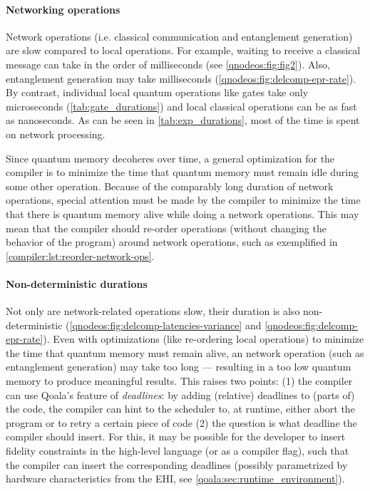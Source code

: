 \paragraph{Networking operations}
Network operations (i.e. classical communication and entanglement generation) are slow compared to local operations.
For example, waiting to receive a classical message can take in the order of milliseconds (see \cref{qnodeos:fig:fig2}).
Also, entanglement generation may take milliseconds (\cref{qnodeos:fig:delcomp-epr-rate}).
By contrast, individual local quantum operations like gates take only microseconds (\cref{tab:gate_durations}) and local classical operations can be as fast as nanoseconds.
As can be seen in \cref{tab:exp_durations}, most of the time is spent on network processing.

Since quantum memory decoheres over time, a general optimization for the compiler is to minimize the time that quantum memory must remain idle during some other operation.
Because of the comparably long duration of network operations, special attention must be made by the compiler to minimize the time that there is quantum memory alive while doing a network operations.
This may mean that the compiler should re-order operations (without changing the behavior of the program) around network operations, such as exemplified in \cref{compiler:lst:reorder-network-ops}.

\paragraph{Non-deterministic durations}
Not only are network-related operations slow, their duration is also non-deterministic (\cref{qnodeos:fig:delcomp-latencies-variance} and \cref{qnodeos:fig:delcomp-epr-rate}).
Even with optimizations (like re-ordering local operations) to minimize the time that quantum memory must remain alive, an network operation (such as entanglement generation) may take too long --- resulting in a too low quantum memory to produce meaningful results.
This raises two points:
(1) the compiler can use Qoala's feature of \emph{deadlines}: by adding (relative) deadlines to (parts of) the code, the compiler can hint to the scheduler to, at runtime, either abort the program or to retry a certain piece of code
(2) the question is what deadline the compiler should insert. For this, it may be possible for the developer to insert fidelity constraints in the high-level language (or as a compiler flag), such that the compiler can insert the corresponding deadlines (possibly parametrized by hardware characteristics from the \acf{EHI}, see \cref{qoala:sec:runtime_environment}).

